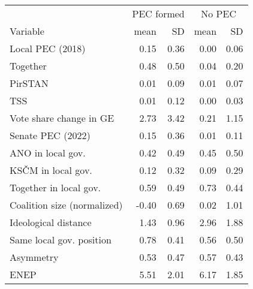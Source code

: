 
\begin{tabular}{l|rr|rr}
& \multicolumn{2}{c|}{PEC formed} & \multicolumn{2}{c}{No PEC} \\
Variable & mean & SD & mean & SD\\
\hline
Local PEC (2018) & 0.15 & 0.36 & 0.00 & 0.06\\
\hline
Together & 0.48 & 0.50 & 0.04 & 0.20\\
\hline
PirSTAN & 0.01 & 0.09 & 0.01 & 0.07\\
\hline
TSS & 0.01 & 0.12 & 0.00 & 0.03\\
\hline
Vote share change in GE & 2.73 & 3.42 & 0.21 & 1.15\\
\hline
Senate PEC (2022) & 0.15 & 0.36 & 0.01 & 0.11\\
\hline
ANO in local gov. & 0.42 & 0.49 & 0.45 & 0.50\\
\hline
KSČM in local gov. & 0.12 & 0.32 & 0.09 & 0.29\\
\hline
Together in local gov. & 0.59 & 0.49 & 0.73 & 0.44\\
\hline
Coalition size (normalized) & -0.40 & 0.69 & 0.02 & 1.01\\
\hline
Ideological distance & 1.43 & 0.96 & 2.96 & 1.88\\
\hline
Same local gov. position & 0.78 & 0.41 & 0.56 & 0.50\\
\hline
Asymmetry & 0.53 & 0.47 & 0.57 & 0.43\\
\hline
ENEP & 5.51 & 2.01 & 6.17 & 1.85\\
\hline
\end{tabular}
